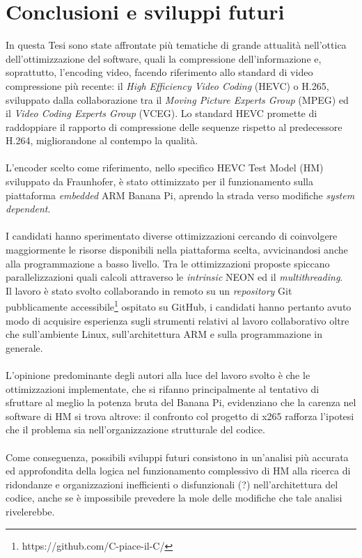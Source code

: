 
\chapter{Conclusioni e sviluppi futuri} %
In questa Tesi sono state affrontate più tematiche di grande attualità  
nell'ottica dell'ottimizzazione del software, quali la compressione 
dell'informazione e, soprattutto, l'encoding video, facendo riferimento allo 
standard di video compressione più recente: il \emph{High Efficiency Video 
Coding} (HEVC) o H.265, sviluppato dalla collaborazione tra il \emph{Moving 
Picture Experts Group} (MPEG) ed il \emph{Video Coding Experts Group} (VCEG). 
Lo standard HEVC promette di raddoppiare il rapporto di compressione delle 
sequenze rispetto al predecessore H.264, migliorandone al contempo la qualità.
\\ \\
L'encoder scelto come riferimento, nello specifico HEVC Test Model (HM) 
sviluppato da Fraunhofer, è stato ottimizzato per il funzionamento sulla 
piattaforma \textit{embedded} ARM Banana Pi, aprendo la strada verso modifiche 
\emph{system dependent}.
\\ \\
I candidati hanno sperimentato diverse ottimizzazioni cercando di coinvolgere 
maggiormente le risorse disponibili nella piattaforma scelta, avvicinandosi 
anche alla programmazione a basso livello. Tra le ottimizzazioni proposte 
spiccano parallelizzazioni quali calcoli attraverso le \textit{intrinsic} NEON 
ed il \textit{multithreading}. \\
Il lavoro è stato svolto collaborando in remoto su un \emph{repository} 
Git pubblicamente accessibile\footnote{https://github.com/C-piace-il-C/} 
ospitato su GitHub, i candidati hanno pertanto avuto modo di acquisire 
esperienza sugli strumenti relativi al lavoro collaborativo oltre che 
sull'ambiente Linux, sull'architettura ARM e sulla programmazione in 
generale.\\ \\
L'opinione predominante degli autori alla luce del lavoro svolto è che le 
ottimizzazioni implementate, che si rifanno principalmente al tentativo di 
sfruttare al meglio la potenza bruta del Banana Pi, evidenziano che la carenza 
nel software di HM si trova altrove: il confronto col progetto di x265 rafforza 
l'ipotesi che il problema sia nell'organizzazione strutturale del codice.
\\ \\
Come conseguenza, possibili sviluppi futuri consistono in un'analisi più 
accurata ed approfondita della logica nel funzionamento complessivo di HM alla 
ricerca di ridondanze e organizzazioni inefficienti o disfunzionali (?) 
nell'architettura del codice, anche se è impossibile prevedere la mole delle 
modifiche che tale analisi rivelerebbe.
\label{Chapter8} %

